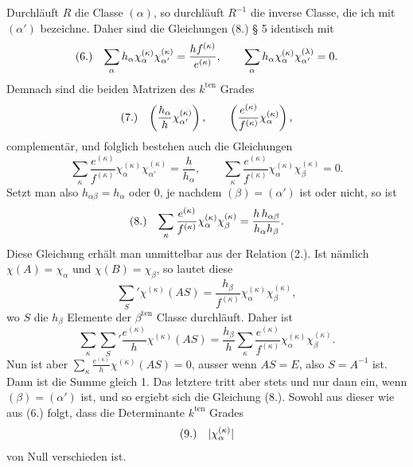 \documentclass[11pt]{article}
\makeatletter
\newcommand{\frobtag}[2]{\[\begin{array}{@{}r@{\quad}l@{}}\textup{(#1)} & \displaystyle #2\end{array}\]}
\newcommand{\frobtagc}[2]{\[\begin{array}{@{}r@{\quad}c@{}}\textup{(#1)} & \displaystyle #2\end{array}\]}
\makeatother
\begin{document}
Durchläuft $R$ die Classe $(\alpha)$, so durchläuft $R^{-1}$ die inverse Classe, die ich mit $(\alpha')$ bezeichne. Daher sind die Gleichungen (8.) § 5 identisch mit
\frobtag{6.}{\sum_\alpha h_\alpha\chi_\alpha^{(\kappa)}\chi_{\alpha'}^{(\kappa)}=\frac{h f^{(\kappa)}}{e^{(\kappa)}},\qquad \sum_\alpha h_\alpha\chi_\alpha^{(\kappa)}\chi_{\alpha'}^{(\lambda)}=0.}
Demnach sind die beiden Matrizen des $k^{\mathrm{ten}}$ Grades
\frobtagc{7.}{\left(\frac{h_\alpha}{h}\chi_{\alpha'}^{(\kappa)}\right),\qquad \left(\frac{e^{(\kappa)}}{f^{(\kappa)}}\chi_\alpha^{(\kappa)}\right),}
complementär, und folglich bestehen auch die Gleichungen
\[
\sum_\kappa\frac{e^{(\kappa)}}{f^{(\kappa)}}\chi_\alpha^{(\kappa)}\chi_{\alpha'}^{(\kappa)}=\frac{h}{h_\alpha},\qquad \sum_\kappa\frac{e^{(\kappa)}}{f^{(\kappa)}}\chi_\alpha^{(\kappa)}\chi_\beta^{(\kappa)}=0.
\]
Setzt man also $h_{\alpha\beta}=h_\alpha$ oder 0, je nachdem $(\beta)=(\alpha')$ ist oder nicht, so ist
\frobtagc{8.}{\sum_\kappa\frac{e^{(\kappa)}}{f^{(\kappa)}}\chi_\alpha^{(\kappa)}\chi_\beta^{(\kappa)}=\frac{h\,h_{\alpha\beta}}{h_\alpha h_\beta}.}
Diese Gleichung erhält man unmittelbar aus der Relation (2.). Ist nämlich $\chi(A)=\chi_\alpha$ und $\chi(B)=\chi_\beta$, so lautet diese
\[
\sum_S'\chi^{(\kappa)}(AS)=\frac{h_\beta}{f^{(\kappa)}}\chi_\alpha^{(\kappa)}\chi_\beta^{(\kappa)},
\]
wo $S$ die $h_\beta$ Elemente der $\beta^{\mathrm{ten}}$ Classe durchläuft. Daher ist
\[
\sum_\kappa\sum_S'\frac{e^{(\kappa)}}{h}\chi^{(\kappa)}(AS)=\frac{h_\beta}{h}\sum_\kappa\frac{e^{(\kappa)}}{f^{(\kappa)}}\chi_\alpha^{(\kappa)}\chi_\beta^{(\kappa)}.
\]
Nun ist aber $\sum_\kappa\frac{e^{(\kappa)}}{h}\chi^{(\kappa)}(AS)=0$, ausser wenn $AS=E$, also $S=A^{-1}$ ist. Dann ist die Summe gleich 1. Das letztere tritt aber stets und nur dann ein, wenn $(\beta)=(\alpha')$ ist, und so ergiebt sich die Gleichung (8.). Sowohl aus dieser wie aus (6.) folgt, dass die Determinante $k^{\mathrm{ten}}$ Grades
\frobtagc{9.}{|\chi_\alpha^{(\kappa)}|}
von Null verschieden ist.
\end{document}
